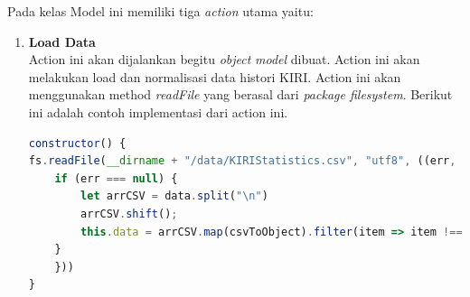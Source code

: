Pada kelas Model ini memiliki tiga \textit{action} utama yaitu:
\begin{enumerate}
    \item {\textbf{Load Data}} \\
Action ini akan dijalankan begitu \textit{object} \textit{model} dibuat. Action ini akan melakukan load dan normalisasi data histori KIRI. Action ini akan menggunakan method \textit{readFile} yang berasal dari \textit{package filesystem}. Berikut ini adalah contoh implementasi dari action ini.


\begin{lstlisting}[label=Kiri_Model, language=JavaScript, caption=Metode Load Data, breaklines]
constructor() {
fs.readFile(__dirname + "/data/KIRIStatistics.csv", "utf8", ((err, data) => {
    if (err === null) {
        let arrCSV = data.split("\n")
        arrCSV.shift();
        this.data = arrCSV.map(csvToObject).filter(item => item !== undefined);
    }
    }))
}
\end{lstlisting}



\end{enumerate}
